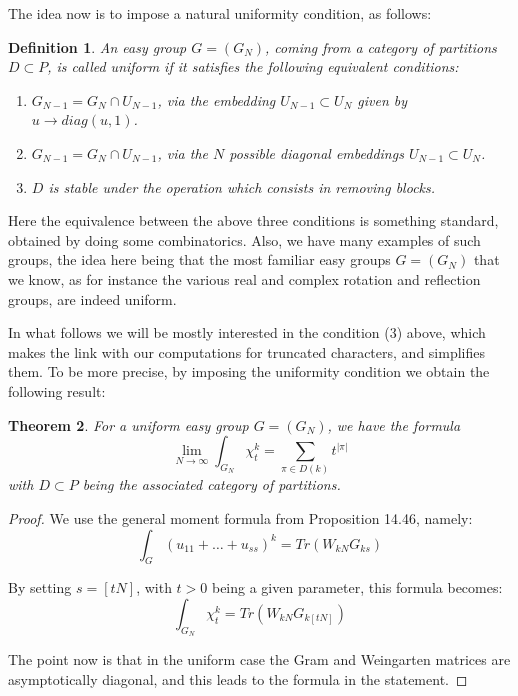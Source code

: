 \documentclass[12pt]{amsbook}
\newtheorem{theorem}{Theorem}[chapter]
\newtheorem{definition}[theorem]{Definition}
\begin{document}
The idea now is to impose a natural uniformity condition, as follows:

\begin{definition}
An easy group $G=(G_N)$, coming from a category of partitions $D\subset P$, is called uniform if it satisfies the following equivalent conditions:
\begin{enumerate}
\item $G_{N-1}=G_N\cap U_{N-1}$, via the embedding $U_{N-1}\subset U_N$ given by $u\to diag(u,1)$.

\item $G_{N-1}=G_N\cap U_{N-1}$, via the $N$ possible diagonal embeddings $U_{N-1}\subset U_N$.

\item $D$ is stable under the operation which consists in removing blocks.
\end{enumerate}
\end{definition}

Here the equivalence between the above three conditions is something standard, obtained by doing some combinatorics. Also, we have many examples of such groups, the idea here being that the most familiar easy groups $G=(G_N)$ that we know, as for instance the various real and complex rotation and reflection groups, are indeed uniform.

\bigskip

In what follows we will be mostly interested in the condition (3) above, which makes the link with our computations for truncated characters, and simplifies them. To be more precise, by imposing the uniformity condition we obtain the following result:

\begin{theorem}
For a uniform easy group $G=(G_N)$, we have the formula
$$\lim_{N\to\infty}\int_{G_N}\chi_t^k=\sum_{\pi\in D(k)}t^{|\pi|}$$
with $D\subset P$ being the associated category of partitions.
\end{theorem}

\begin{proof}
We use the general moment formula from Proposition 14.46, namely:
$$\int_G(u_{11}+\ldots +u_{ss})^k=Tr(W_{kN}G_{ks})$$

By setting $s=[tN]$, with $t>0$ being a given parameter, this formula becomes:
$$\int_{G_N}\chi_t^k=Tr(W_{kN}G_{k[tN]})$$

The point now is that in the uniform case the Gram and Weingarten matrices are asymptotically diagonal, and this leads to the formula in the statement.
\end{proof}
\end{document}
